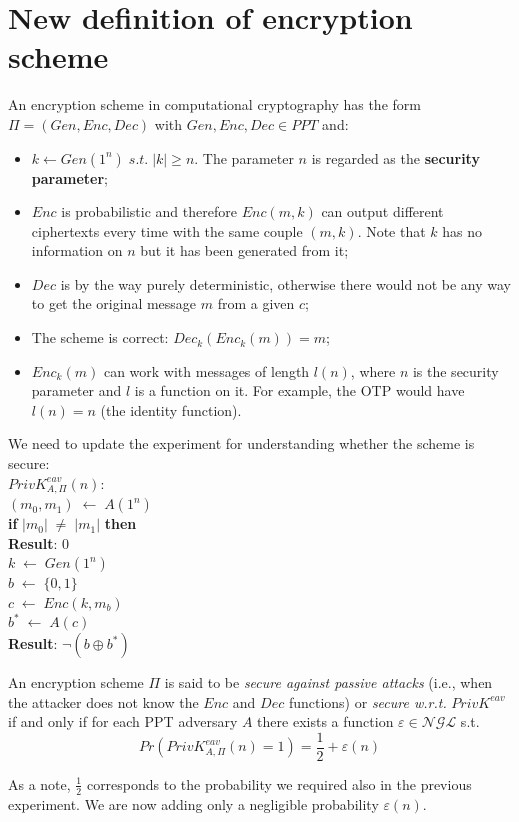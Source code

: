 \documentclass[../main]{subfiles}
\begin{document}
\section{New definition of encryption scheme}
An encryption scheme in computational cryptography has the form $\Pi{} = (Gen, Enc, Dec)$ with $Gen, Enc, Dec \in{} PPT$ and:
\begin{itemize}
    \item $k \leftarrow{} Gen(1^n) \; s.t. \; |k| \ge{} n$. The parameter $n$ is regarded as the \textbf{security parameter};
    \item $Enc$ is probabilistic and therefore $Enc(m, k)$ can output different ciphertexts every time with the same couple $(m, k)$. Note that $k$ has no information on $n$ but it has been generated from it;
    \item $Dec$ is by the way purely deterministic, otherwise there would not be any way to get the original message $m$ from a given $c$;
    \item The scheme is correct: $Dec_k(Enc_k(m)) = m$;
    \item $Enc_k(m)$ can work with messages of length $l(n)$, where $n$ is the security parameter and $l$ is a function on it. For example, the OTP would have $l(n) = n$ (the identity function).
\end{itemize}
We need to update the experiment for understanding whether the scheme is secure:\\
$PrivK^{eav}_{A,\Pi}(n)$:\\
$(m_0,m_1) \; \leftarrow{} \; A(1^n)$\\
\textbf{if} $|m_0| \; \neq{} \; |m_1|$ \textbf{then}\\
\hspace*{20pt}\textbf{Result}: 0\\
$k \; \leftarrow{} \; Gen(1^n)$\\
$b \; \leftarrow{} \; \{0,1\}$\\
$c \; \leftarrow{} \; Enc(k,m_b)$\\
$b^* \; \leftarrow{} \; A(c)$\\
\textbf{Result}: $\neg(b \oplus{} b^*)$
\begin{definition}
    An encryption scheme $\Pi$ is said to be \textit{secure against passive attacks} (i.e., when the attacker does not know the $Enc$ and $Dec$ functions) or \textit{secure w.r.t.} $PrivK^{eav}$
    if and only if for each PPT adversary $A$ there exists a function $\varepsilon{} \in{} \mathcal{NGL}$ s.t.
    $$Pr(PrivK^{eav}_{A,\Pi}(n) = 1) = \frac{1}{2} + \varepsilon(n)$$
\end{definition}
As a note, $\frac{1}{2}$ corresponds to the probability we required also in the previous experiment. We are now adding only a negligible probability $\varepsilon(n)$.
\end{document}
